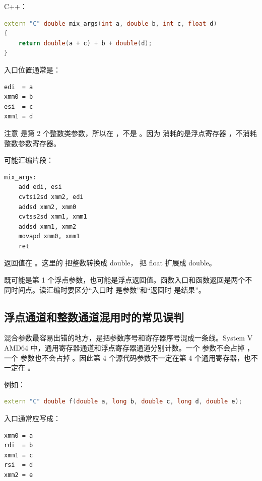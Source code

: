 C++：

\begin{lstlisting}[language=C++]
extern "C" double mix_args(int a, double b, int c, float d)
{
    return double(a + c) + b + double(d);
}
\end{lstlisting}

入口位置通常是：

\begin{lstlisting}
edi  = a
xmm0 = b
esi  = c
xmm1 = d
\end{lstlisting}

注意  是第 2 个整数类参数，所以在 ，不是 。因为  消耗的是浮点寄存器 ，不消耗整数参数寄存器。

可能汇编片段：

\begin{lstlisting}
mix_args:
    add edi, esi
    cvtsi2sd xmm2, edi
    addsd xmm2, xmm0
    cvtss2sd xmm1, xmm1
    addsd xmm1, xmm2
    movapd xmm0, xmm1
    ret
\end{lstlisting}

返回值在 。这里的  把整数转换成 double， 把 float 扩展成 double。

\begin{warningbox}
 既可能是第 1 个浮点参数，也可能是浮点返回值。函数入口和函数返回是两个不同时间点。读汇编时要区分“入口时  是参数”和“返回时  是结果”。
\end{warningbox}

\subsection{浮点通道和整数通道混用时的常见误判}

混合参数最容易出错的地方，是把参数序号和寄存器序号混成一条线。System V AMD64 中，通用寄存器通道和浮点寄存器通道分别计数。一个  参数不会占掉 ，一个  参数也不会占掉 。因此第 4 个源代码参数不一定在第 4 个通用寄存器，也不一定在 。

例如：

\begin{lstlisting}[language=C++]
extern "C" double f(double a, long b, double c, long d, double e);
\end{lstlisting}

入口通常应写成：

\begin{lstlisting}
xmm0 = a
rdi  = b
xmm1 = c
rsi  = d
xmm2 = e
\end{lstlisting}

